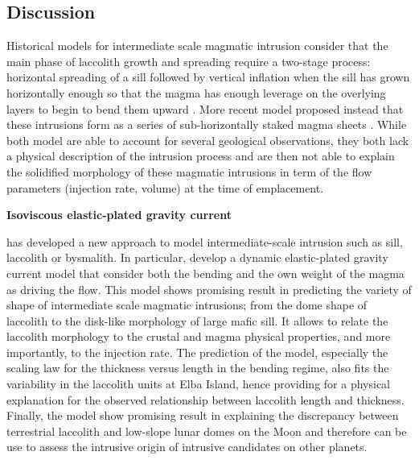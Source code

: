 \subsection{Discussion}
\label{sec:discussion-1}

Historical models  for intermediate scale magmatic  intrusion consider
that  the main  phase  of  laccolith growth  and  spreading require  a
two-stage process: horizontal spreading of a sill followed by vertical
inflation  when the  sill has  grown horizontally  enough so  that the
magma has  enough leverage on  the overlying  layers to begin  to bend
them  upward  \citep{Johnson:1973ho,Koch:1981if}.  More  recent  model
proposed  instead   that  these  intrusions   form  as  a   series  of
sub-horizontally            staked             magma            sheets
\citep{Morgan:2008hj,Menand:2011ki}.   While both  model  are able  to
account for several geological observations, they both lack a physical
description of the intrusion process and  are then not able to explain
the solidified morphology of these  magmatic intrusions in term of the
flow parameters (injection rate, volume) at the time of emplacement.

\vspace{.5cm}   \textbf{Isoviscous  elastic-plated   gravity  current}
\vspace{.5cm}

\citet{Michaut:2011kg}  has   developed  a   new  approach   to  model
intermediate-scale intrusion such as  sill, laccolith or bysmalith. In
particular,  \citet{Michaut:2011kg} develop  a dynamic  elastic-plated
gravity  current model  that consider  both  the bending  and the  own
weight of the  magma as driving the flow.  This  model shows promising
result  in  predicting the  variety  of  shape of  intermediate  scale
magmatic intrusions; from the dome shape of laccolith to the disk-like
morphology of  large mafic  sill.  It allows  to relate  the laccolith
morphology  to the  crustal and  magma physical  properties, and  more
importantly,  to the  injection rate.   The prediction  of the  model,
especially  the scaling  law for  the thickness  versus length  in the
bending regime,  also fits the  variability in the laccolith  units at
Elba  Island,  hence providing  for  a  physical explanation  for  the
observed relationship between laccolith length and thickness. Finally,
the model show promising result  in explaining the discrepancy between
terrestrial  laccolith  and low-slope  lunar  domes  on the  Moon  and
therefore  can be  use to  assess  the intrusive  origin of  intrusive
candidates on other planets.

